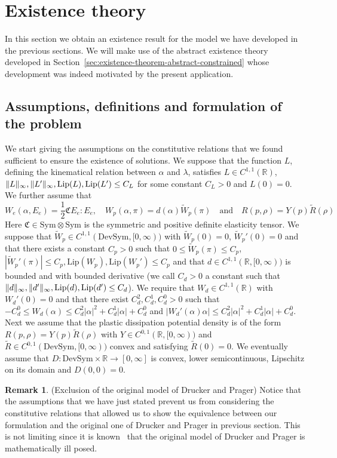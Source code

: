 \documentclass[a4paper,10pt,twoside]{amsbook}
\numberwithin{section}{chapter}
\numberwithin{equation}{chapter}
\theoremstyle{definition}
\newtheorem{rmk}[prop]{Remark}
\DeclarePairedDelimiter{\norm}{\lVert}{\rVert}
\begin{document}
\section{Existence theory}
\label{sec:existence-small}

In this section we obtain an existence result for the model we have developed in the previous sections. We will make use of the abstract existence theory developed in Section~\ref{sec:existence-theorem-abstract-constrained} whose development was indeed motivated by the present application.

\subsection{Assumptions, definitions and formulation of the problem}

We start giving the assumptions on the constitutive relations that we found sufficient to ensure the existence of solutions. We suppose that the function $L$, defining the kinematical relation between $\alpha$ and $\lambda$, satisfies $L\in C^{1,1}(\mathbb{R})$, $\norm{L}_\infty,\norm{L'}_\infty,\text{Lip}(L),\text{Lip}(L')\le C_L$ for some constant $C_L>0$ and $L(0)=0$. We further assume that
\[
W_e(\alpha,E_e)=\frac{1}{2}\mathfrak{C}E_e:E_e,\quad W_p(\alpha,\pi)=d(\alpha)\tilde W_p(\pi)\quad\text{and}\quad R(p,\rho)=Y(p)\tilde R(\rho)
\]
Here $\mathfrak{C}\in\text{Sym}\otimes\text{Sym}$ is the symmetric and positive definite elasticity tensor. We suppose that $\tilde W_p\in C^{1,1}(\text{DevSym},[0,\infty))$ with $\tilde W_p(0)=0$, $\tilde W_p'(0)=0$ and that there exists a constant $C_p>0$ such that $0\le\tilde W_p(\pi)\le C_p$, $|\tilde W_p'(\pi)|\le C_p,\text{Lip}(W_p),\text{Lip}(W_p')\le C_p$ and that $d\in C^{1,1}(\mathbb{R},[0,\infty))$ is bounded and with bounded derivative (we call $C_d>0$ a constant such that $\norm{d}_\infty,\norm{d'}_\infty,\text{Lip}(d),\text{Lip}(d')\le C_d$). We require that $W_d\in C^{1,1}(\mathbb{R})$ with $W_d'(0)=0$ and that there exist $C_d^2,C_d^1,C_d^0>0$ such that $-C_d^0\le W_d(\alpha)\le C_d^2|\alpha|^2+C_d^1|\alpha|+C_d^0$ and $|W_d'(\alpha)\alpha|\le C_d^2|\alpha|^2+C_d^1|\alpha|+C_d^0$. Next we assume that the plastic dissipation potential density is of the form $R(p,\rho)=Y(p)\tilde R(\rho)$ with $Y\in C^{0,1}(\mathbb{R},[0,\infty))$ and $\tilde R\in C^{0,1}(\text{DevSym},[0,\infty))$ convex and satisfying $\tilde R(0)=0$. We eventually assume that $D\colon\text{DevSym}\times\mathbb{R}\to[0,\infty]$ is convex, lower semicontinuous, Lipschitz on its domain and $D(0,0)=0$.
\begin{rmk}(Exclusion of the original model of Drucker and Prager)
Notice that the assumptions that we have just stated prevent us from considering the constitutive relations that allowed us to show the equivalence between our formulation and the original one of Drucker and Prager in previous section. This is not limiting since it is known~\cite{morafrancfort} that the original model of Drucker and Prager is mathematically ill posed.
\end{rmk}
\end{document}
